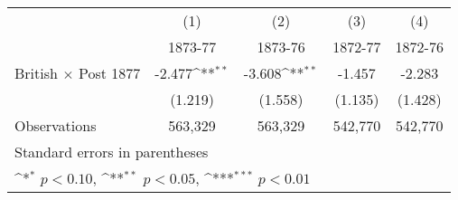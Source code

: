 {
\def\sym#1{\ifmmode^{#1}\else\(^{#1}\)\fi}
\begin{tabular}{l*{4}{c}}
\hline\hline
                    &\multicolumn{1}{c}{(1)}&\multicolumn{1}{c}{(2)}&\multicolumn{1}{c}{(3)}&\multicolumn{1}{c}{(4)}\\
                    &\multicolumn{1}{c}{1873-77}&\multicolumn{1}{c}{1873-76}&\multicolumn{1}{c}{1872-77}&\multicolumn{1}{c}{1872-76}\\
\hline
British $\times$ Post 1877&      -2.477\sym{**} &      -3.608\sym{**} &      -1.457         &      -2.283         \\
                    &     (1.219)         &     (1.558)         &     (1.135)         &     (1.428)         \\
\hline
Observations        &     563,329         &     563,329         &     542,770         &     542,770         \\
\hline\hline
\multicolumn{5}{l}{\footnotesize Standard errors in parentheses}\\
\multicolumn{5}{l}{\footnotesize \sym{*} \(p<0.10\), \sym{**} \(p<0.05\), \sym{***} \(p<0.01\)}\\
\end{tabular}
}
